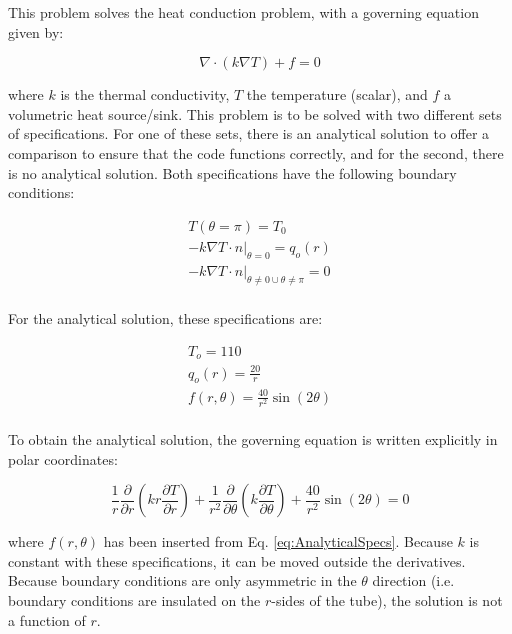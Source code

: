 \documentclass[10pt]{article}
\begin{document}
This problem solves the heat conduction problem, with a governing equation given by:

\begin{equation}
\label{eq:HeatConduction}
\nabla\cdot(k\nabla T)+f=0
\end{equation}

where \(k\) is the thermal conductivity, \(T\) the temperature (scalar), and \(f\) a volumetric heat source/sink. This problem is to be solved with two different sets of specifications. For one of these sets, there is an analytical solution to offer a comparison to ensure that the code functions correctly, and for the second, there is no analytical solution. Both specifications have the following boundary conditions:

\begin{equation}
\begin{aligned}
T(\theta=\pi)=T_0\\
-k\nabla T\cdot\hat{n}|_{\theta=0}=q_o(r)\\
-k\nabla T\cdot\hat{n}|_{\theta\neq0\cup \theta\neq\pi}=0\\
\end{aligned}
\end{equation}

For the analytical solution, these specifications are:

\begin{equation}
\label{eq:AnalyticalSpecs}
\begin{aligned}
T_o=110\\
q_o(r)=\frac{20}{r}\\
f(r,\theta)=\frac{40}{r^2}\sin{(2\theta)}\\
\end{aligned}
\end{equation}

To obtain the analytical solution, the governing equation is written explicitly in polar coordinates:

\begin{equation}
\frac{1}{r}\frac{\partial}{\partial r}\left(kr\frac{\partial T}{\partial r}\right)+\frac{1}{r^2}\frac{\partial}{\partial\theta}\left(k\frac{\partial T}{\partial\theta}\right)+\frac{40}{r^2}\sin{(2\theta)}=0
\end{equation}

where \(f(r,\theta)\) has been inserted from Eq. \eqref{eq:AnalyticalSpecs}. Because \(k\) is constant with these specifications, it can be moved outside the derivatives. Because boundary conditions are only asymmetric in the \(\theta\) direction (i.e. boundary conditions are insulated on the \(r\)-sides of the tube), the solution is not a function of \(r\). 
\end{document}
